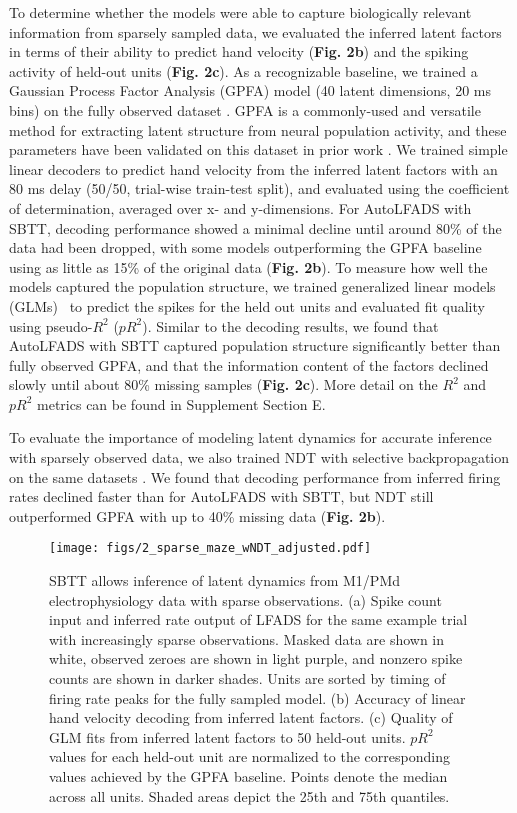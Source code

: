 \documentclass{article}
\begin{document}
To determine whether the models were able to capture biologically relevant information from sparsely sampled data, we evaluated the inferred latent factors in terms of their ability to predict hand velocity (\textbf{Fig. 2b}) and the spiking activity of held-out units (\textbf{Fig. 2c}). As a recognizable baseline, we trained a Gaussian Process Factor Analysis (GPFA) model (40 latent dimensions, 20 ms bins) on the fully observed dataset \cite{byron2009gaussian,elephant18}. GPFA is a commonly-used and versatile method for extracting latent structure from neural population activity, and these parameters have been validated on this dataset in prior work \cite{pandarinath2018inferring}. We trained simple linear decoders to predict hand velocity from the inferred latent factors with an 80 ms delay (50/50, trial-wise train-test split), and evaluated using the coefficient of determination, averaged over x- and y-dimensions. For AutoLFADS with SBTT, decoding performance showed a minimal decline until around 80\% of the data had been dropped, with some models outperforming the GPFA baseline using as little as 15\% of the original data (\textbf{Fig. 2b}). To measure how well the models captured the population structure, we trained generalized linear models (GLMs)~\cite{paninski2004maximum,Jas2020} to predict the spikes for the held out units and evaluated fit quality using pseudo-$R^{2}$ ($pR^{2}$). Similar to the decoding results, we found that AutoLFADS with SBTT captured population structure significantly better than fully observed GPFA, and that the information content of the factors declined slowly until about 80\% missing samples (\textbf{Fig. 2c}). More detail on the $R^2$ and $pR^2$ metrics can be found in Supplement Section E.

To evaluate the importance of modeling latent dynamics for accurate inference with sparsely observed data, we also trained NDT with selective backpropagation on the same datasets \cite{ye2021representation}. We found that decoding performance from inferred firing rates declined faster than for AutoLFADS with SBTT, but NDT still outperformed GPFA with up to 40\% missing data (\textbf{Fig. 2b}).

\begin{figure}
  \centering
  \texttt{[image: figs/2\_sparse\_maze\_wNDT\_adjusted.pdf]}
  \caption{SBTT allows inference of latent dynamics from M1/PMd electrophysiology data with sparse observations. (a) Spike count input and inferred rate output of LFADS for the same example trial with increasingly sparse observations. Masked data are shown in white, observed zeroes are shown in light purple, and nonzero spike counts are shown in darker shades. Units are sorted by timing of firing rate peaks for the fully sampled model. (b) Accuracy of linear hand velocity decoding from inferred latent factors. (c) Quality of GLM fits from inferred latent factors to 50 held-out units. $pR^{2}$ values for each held-out unit are normalized to the corresponding values achieved by the GPFA baseline. Points denote the median across all units. Shaded areas depict the 25th and 75th quantiles.}
  \label{fig:sparse_maze}
\end{figure}
\end{document}
